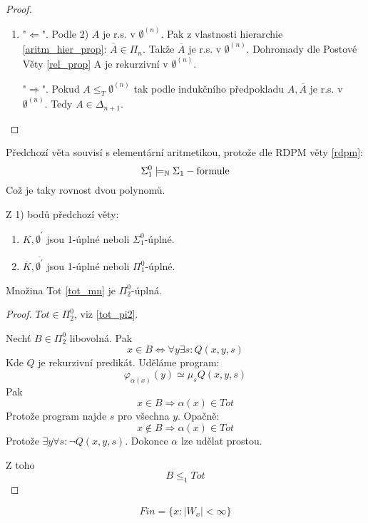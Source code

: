 \begin{proof}
\begin{enumerate}
		\item "$\Leftarrow$". Podle 2) $A$ je r.s. v $\emptyset^{(n)}$.
			Pak z vlastnosti hierarchie \cref{aritm_hier_prop}: $\overline{A} \in \Pi_n$.
			Takže $\overline{A}$ je r.s. v $\emptyset^{(n)}$.
			Dohromady dle Postové Věty \cref{rel_prop} A je rekurzivní v $\emptyset^{(n)}$.

			"$\Rightarrow$". Pokud $A \leq_T \emptyset^{(n)}$ tak podle indukčního předpokladu $A, \overline{A}$ je r.s. v $\emptyset^{(n)}$.
			Tedy $A \in \Delta_{n + 1}$.
	\end{enumerate}
\end{proof}

\begin{note}
	Předchozí věta souvisí s elementární aritmetikou, protože dle RDPM věty \cref{rdpm}:
	\[ \Sigma_1^0 \models_{\operatorname{\mathbb{N}}} \Sigma_1-\text{formule} \]
	Což je taky rovnost dvou polynomů.
\end{note}

Z 1) bodů předchozí věty:
\begin{properties}
	\begin{enumerate}
		\item $K, \emptyset^{\prime}$ jsou 1-úplné neboli $\Sigma_1^0$-úplné.
		\item $\overline{K}, \overline{\emptyset^{\prime}}$ jsou 1-úplné neboli $\Pi_1^0$-úplné.
	\end{enumerate}
\end{properties}

\begin{theorem}
	Množina Tot \cref{tot_mn} je $\Pi_2^0$-úplná.
\end{theorem}
\begin{proof}
	$Tot \in \Pi_2^0$, viz \cref{tot_pi2}.

	Nechť $B \in \Pi_2^0$ libovolná.
	Pak
	\[ x \in B \iff \forall y \exists s: Q(x, y, s) \]
	Kde $Q$ je rekurzivní predikát.
	Uděláme program:
	\[ \varphi_{\alpha(x)}(y) \simeq \mu_s Q(x, y, s) \]
	Pak
	\[ x \in B \Rightarrow \alpha(x) \in Tot \]
	Protože program najde $s$ pro všechna $y$.
	Opačně:
	\[ x \notin B \Rightarrow \alpha(x) \in Tot \]
	Protože $\exists y \forall s: \neg Q(x, y, s)$.
	Dokonce $\alpha$ lze udělat prostou.

	Z toho
	\[ B \leq_1 Tot \]
\end{proof}

\begin{definition}[Fin]
	\[ Fin = \{ x: |W_x| < \infty \} \]
\end{definition}

